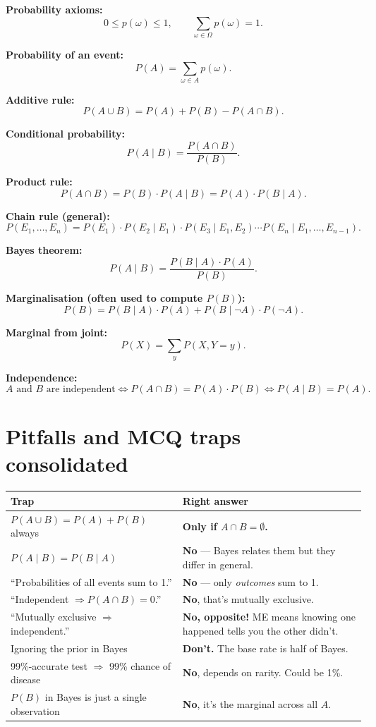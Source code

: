 \documentclass[11pt, a4paper]{article}
\newcommand{\thead}[1]{\textbf{#1}}
\begin{document}
\textbf{Probability axioms:}
\[
0 \le p(\omega) \le 1, \qquad \sum_{\omega \in \Omega} p(\omega) = 1.
\]

\textbf{Probability of an event:}
\[
P(A) = \sum_{\omega \in A} p(\omega).
\]

\textbf{Additive rule:}
\[
P(A \cup B) = P(A) + P(B) - P(A \cap B).
\]

\textbf{Conditional probability:}
\[
P(A \mid B) = \frac{P(A \cap B)}{P(B)}.
\]

\textbf{Product rule:}
\[
P(A \cap B) = P(B) \cdot P(A \mid B) = P(A) \cdot P(B \mid A).
\]

\textbf{Chain rule (general):}
\[
P(E_1, \dots, E_n) = P(E_1) \cdot P(E_2 \mid E_1) \cdot P(E_3 \mid E_1, E_2) \cdots P(E_n \mid E_1, \dots, E_{n-1}).
\]

\textbf{Bayes theorem:}
\[
P(A \mid B) = \frac{P(B \mid A) \cdot P(A)}{P(B)}.
\]

\textbf{Marginalisation (often used to compute $P(B)$):}
\[
P(B) = P(B \mid A) \cdot P(A) + P(B \mid \neg A) \cdot P(\neg A).
\]

\textbf{Marginal from joint:}
\[
P(X) = \sum_y P(X, Y = y).
\]

\textbf{Independence:}
\[
A \text{ and } B \text{ are independent} \iff P(A \cap B) = P(A) \cdot P(B) \iff P(A \mid B) = P(A).
\]

\section*{Pitfalls and MCQ traps consolidated}

\begin{trapbox}[summary]
\begin{tabular}{@{}p{6.5cm}p{8cm}@{}}
\toprule
\thead{Trap} & \thead{Right answer} \\
\midrule
$P(A \cup B) = P(A) + P(B)$ always   & \textbf{Only if $A \cap B = \emptyset$.} \\
$P(A \mid B) = P(B \mid A)$           & \textbf{No} — Bayes relates them but they differ in general. \\
``Probabilities of all events sum to 1.'' & \textbf{No} — only \emph{outcomes} sum to 1. \\
``Independent $\Rightarrow P(A \cap B) = 0$.'' & \textbf{No}, that's mutually exclusive. \\
``Mutually exclusive $\Rightarrow$ independent.'' & \textbf{No, opposite!} ME means knowing one happened tells you the other didn't. \\
Ignoring the prior in Bayes            & \textbf{Don't.} The base rate is half of Bayes. \\
99\%-accurate test $\Rightarrow$ 99\% chance of disease & \textbf{No}, depends on rarity. Could be 1\%. \\
$P(B)$ in Bayes is just a single observation & \textbf{No}, it's the marginal across all $A$. \\
\bottomrule
\end{tabular}
\end{trapbox}
\end{document}
